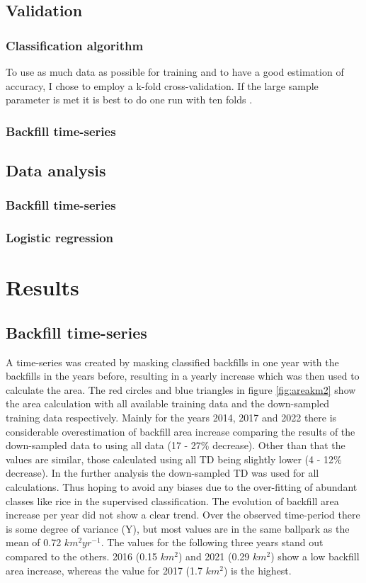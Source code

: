 \documentclass[11pt, letterpaper, oneside]{article}
\begin{document}
\subsection{Validation}

\subsubsection{Classification algorithm}
To use as much data as possible for training and to have a good estimation of accuracy, I chose to employ a k-fold cross-validation. If the large sample parameter is met it is best to do one run with ten folds \cite{Wong.2020}.
\subsubsection{Backfill time-series}

\subsection{Data analysis}

\subsubsection{Backfill time-series}

\subsubsection{Logistic regression} 

\newpage
\section{Results}

\subsection{Backfill time-series}
A time-series was created by masking classified backfills in one year with the backfills in the years before, resulting in a yearly increase which was then used to calculate the area. The red circles and blue triangles in figure \ref{fig:areakm2} show the area calculation with all available training data and the down-sampled training data respectively. Mainly for the years 2014, 2017 and 2022 there is considerable overestimation of backfill area increase comparing the results of the down-sampled data to using all data (17 - 27\% decrease). Other than that the values are similar, those calculated using all TD being slightly lower (4 - 12\% decrease). 
In the further analysis the down-sampled TD was used for all calculations. Thus hoping to avoid any biases due to the over-fitting of abundant classes like rice in the supervised classification.
The evolution of backfill area increase per year did not show a clear trend. Over the observed time-period there is some degree of variance (Y), but most values are in the same ballpark as the mean of 0.72 $km^2yr^{-1}$.
The values for the following three years stand out compared to the others. 2016 (0.15 $km^2$) and 2021 (0.29 $km^2$) show a low backfill area increase, whereas the value for 2017 (1.7 $km^2$) is the highest.
\end{document}
